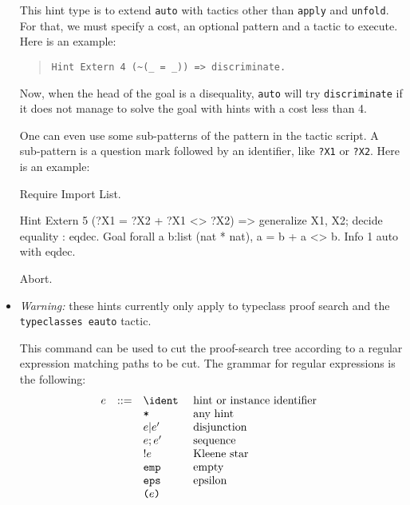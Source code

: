 \begin{itemize}
  This hint type is to extend \texttt{auto} with tactics other than
  \texttt{apply} and \texttt{unfold}. For that, we must specify a
  cost, an optional pattern and a tactic to execute. Here is an example:

\begin{quotation}
\begin{verbatim}
Hint Extern 4 (~(_ = _)) => discriminate.
\end{verbatim}
\end{quotation}

  Now, when the head of the goal is a disequality, \texttt{auto} will
  try \texttt{discriminate} if it does not manage to solve the goal
  with hints with a cost less than 4.

  One can even use some sub-patterns of the pattern in the tactic
  script. A sub-pattern is a question mark followed by an identifier, like
  \texttt{?X1} or \texttt{?X2}. Here is an example:

\begin{coq_example*}
Require Import List.
\end{coq_example*}
\begin{coq_example}
Hint Extern 5   ({?X1 = ?X2} + {?X1 <> ?X2}) =>
 generalize X1, X2; decide equality : eqdec.
Goal
forall a b:list (nat * nat), {a = b} + {a <> b}.
Info 1 auto with eqdec.
\end{coq_example}
\begin{coq_eval}
Abort.
\end{coq_eval}

\item {}
\label{HintCut}

  \textit{Warning:} these hints currently only apply to typeclass proof search and
  the \texttt{typeclasses eauto} tactic.

  This command can be used to cut the proof-search tree according to a
  regular expression matching paths to be cut. The grammar for regular
  expressions is the following:
\[\begin{array}{lcll}
  e & ::= & \ident & \text{ hint or instance identifier } \\
  & & \texttt{*} & \text{ any hint } \\
  & & e | e' & \text{ disjunction } \\
  & & e ; e' & \text{ sequence } \\
  & & ! e & \text{ Kleene star } \\
  & & \texttt{emp} & \text{ empty } \\
  & & \texttt{eps} & \text{ epsilon } \\
  & & \texttt{(} e \texttt{)} & 
\end{array}\]


\end{itemize}

